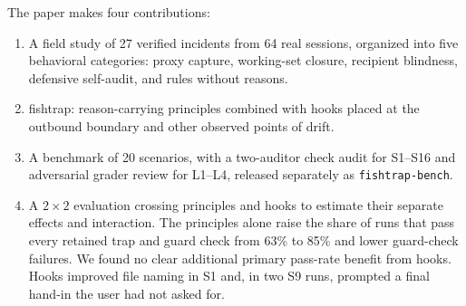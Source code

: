 The paper makes four contributions:
\begin{enumerate}
    \item A field study of 27 verified incidents from 64 real sessions, organized into five behavioral categories: proxy capture, working-set closure, recipient blindness, defensive self-audit, and rules without reasons.
    \item fishtrap: reason-carrying principles combined with hooks placed at the outbound boundary and other observed points of drift.
    \item A benchmark of 20 scenarios, with a two-auditor check audit for S1--S16 and adversarial grader review for L1--L4, released separately as \texttt{fishtrap-bench}.
    \item A $2\times2$ evaluation crossing principles and hooks to estimate their separate effects and interaction. The principles alone raise the share of runs that pass every retained trap and guard check from 63\% to 85\% and lower guard-check failures. We found no clear additional primary pass-rate benefit from hooks. Hooks improved file naming in S1 and, in two S9 runs, prompted a final hand-in the user had not asked for.
\end{enumerate}
